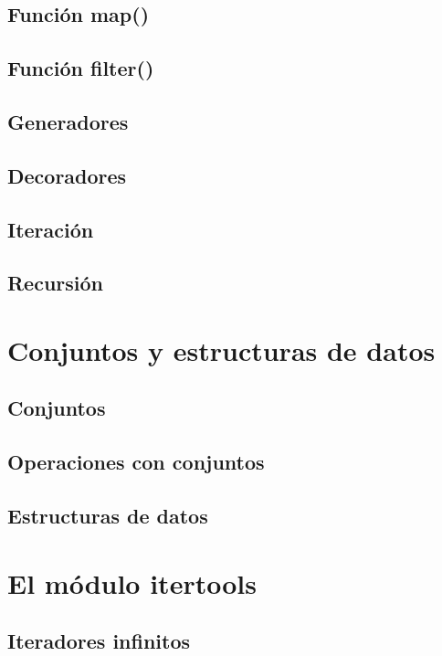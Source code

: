 \documentclass{report}
\begin{document}
\section{Función map()}

\section{Función filter()}

\section{Generadores}

\section{Decoradores}

\section{Iteración}

\section{Recursión}

\clearpage\chapter{Conjuntos y estructuras de datos}

\section{Conjuntos}

\section{Operaciones con conjuntos}

\section{Estructuras de datos}

\clearpage\chapter{El módulo itertools}

\section{Iteradores infinitos}
\end{document}

